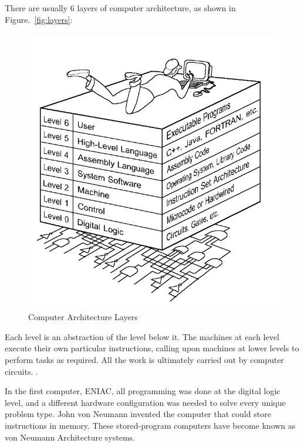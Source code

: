 \documentclass[doc,natbib,12pt]{apa6}
\begin{document}
	There are usually 6 layers of computer architecture, as shown in Figure.~\vref{fig:layers}:
	\begin{figure}[htpb]
		\centering
		\includegraphics[width=1\textwidth]{C1.png}
		\caption{\label{fig:layers}Computer Architecture Layers \citep{Null2012}}
	\end{figure}
	Each level is an abstraction of the level below it. The machines at each level execute their own particular instructions, calling upon machines at lower levels to perform tasks as required. All the work is ultimately carried out by computer circuits. \citep{Null2012}.
	
	In the first computer, ENIAC, all programming was done at the digital logic level, and a different hardware configuration was needed to solve every unique problem type. John von Neumann invented the computer that could store instructions in memory. These stored-program computers have become known as von Neumann Architecture systems.
	
\end{document}
